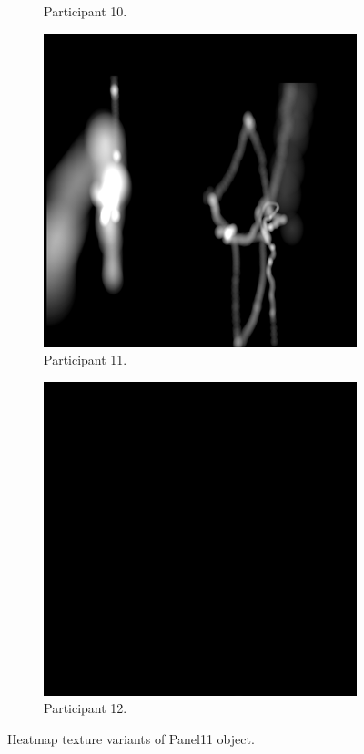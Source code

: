 \begin{figure}[!ht]
\begin{subfigure}[b]{0.24\textwidth}
        \caption{Participant 10.}
    \end{subfigure}
    \hfill    
    \begin{subfigure}[b]{0.24\textwidth}
        \centering
        \includegraphics[width=\textwidth]{img/data/Panel11/single/11.png}
        \caption{Participant 11.}
    \end{subfigure}
    \hfill    
    \begin{subfigure}[b]{0.24\textwidth}
        \centering
        \includegraphics[width=\textwidth]{img/data/Panel11/single/12.png}
        \caption{Participant 12.}
    \end{subfigure}
    \caption{Heatmap texture variants of Panel11 object.}
    \label{fig:Panel11-object-heatmaps.}
\end{figure}


